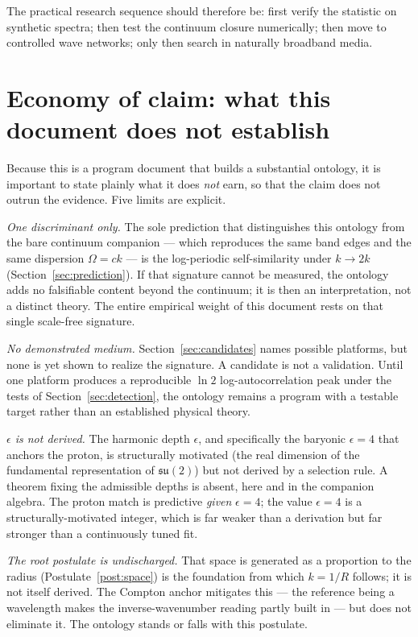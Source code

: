 \documentclass[11pt,a4paper]{article}
\begin{document}
The practical research sequence should therefore be: first verify the statistic on synthetic spectra; then test the continuum closure numerically; then move to controlled wave networks; only then search in naturally broadband media.

\section{Economy of claim: what this document does not establish}\label{sec:limits}

Because this is a program document that builds a substantial ontology, it is important to state plainly what it does \emph{not} earn, so that the claim does not outrun the evidence. Five limits are explicit.

\emph{One discriminant only.} The sole prediction that distinguishes this ontology from the bare continuum companion --- which reproduces the same band edges and the same dispersion $\Omega=ck$ --- is the log-periodic self-similarity under $k\to2k$ (Section~\ref{sec:prediction}). If that signature cannot be measured, the ontology adds no falsifiable content beyond the continuum; it is then an interpretation, not a distinct theory. The entire empirical weight of this document rests on that single scale-free signature.

\emph{No demonstrated medium.} Section~\ref{sec:candidates} names possible platforms, but none is yet shown to realize the signature. A candidate is not a validation. Until one platform produces a reproducible $\ln2$ log-autocorrelation peak under the tests of Section~\ref{sec:detection}, the ontology remains a program with a testable target rather than an established physical theory.

\emph{$\epsilon$ is not derived.} The harmonic depth $\epsilon$, and specifically the baryonic $\epsilon=4$ that anchors the proton, is structurally motivated (the real dimension of the fundamental representation of $\mathfrak{su}(2)$) but not derived by a selection rule. A theorem fixing the admissible depths is absent, here and in the companion algebra. The proton match is predictive \emph{given} $\epsilon=4$; the value $\epsilon=4$ is a structurally-motivated integer, which is far weaker than a derivation but far stronger than a continuously tuned fit.

\emph{The root postulate is undischarged.} That space is generated as a proportion to the radius (Postulate~\ref{post:space}) is the foundation from which $k=1/R$ follows; it is not itself derived. The Compton anchor mitigates this --- the reference being a wavelength makes the inverse-wavenumber reading partly built in --- but does not eliminate it. The ontology stands or falls with this postulate.
\end{document}
